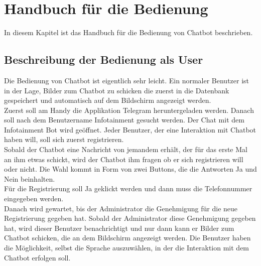 \section{Handbuch für die Bedienung}
In diesem Kapitel ist das Handbuch für die Bedienung von Chatbot beschrieben.
\subsection{Beschreibung der Bedienung als User}
Die Bedienung von Chatbot ist eigentlich sehr leicht. Ein normaler Benutzer ist in der Lage, Bilder zum Chatbot zu schicken die zuerst in die Datenbank gespeichert und automatisch auf dem Bildschirm angezeigt werden. \\
Zuerst soll am Handy die Applikation Telegram heruntergeladen werden. Danach soll nach dem Benutzername Infotainment gesucht werden. Der Chat mit dem Infotainment Bot wird geöffnet. 
Jeder Benutzer, der eine Interaktion mit Chatbot haben will, soll sich zuerst registrieren. \\
Sobald der Chatbot eine Nachricht von jemandem erh\"alt, der für das erste Mal an ihm etwas schickt, wird der Chatbot ihm fragen ob er sich registrieren will oder nicht. Die Wahl kommt in Form von zwei Buttons, die die Antworten Ja und Nein beinhalten.\\
Für die Registrierung soll Ja geklickt werden und dann muss die Telefonnummer eingegeben werden. \\
Danach wird gewartet, bis der Administrator die Genehmigung für die neue Registrierung gegeben hat. Sobald der Administrator diese Genehmigung gegeben hat, wird dieser Benutzer benachrichtigt und nur dann kann er Bilder zum Chatbot schicken, die an dem Bildschirm angezeigt werden. Die Benutzer haben die M\"oglichkeit, selbst die Sprache auszuw\"ahlen, in der die Interaktion mit dem Chatbot erfolgen soll.
